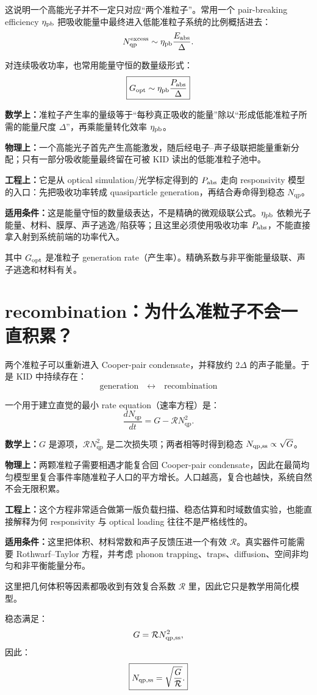 \documentclass[11pt,a4paper,openany]{ctexrep}
\newcommand{\formulaexplain}[4]{%
\begin{formulaguidebox}
\textbf{\color{KidBlue}数学上：}#1\par
\textbf{\color{KidTeal}物理上：}#2\par
\textbf{\color{KidGold!55!black}工程上：}#3\par
\textbf{\color{KidRed}适用条件：}#4
\end{formulaguidebox}%
}
\newcommand{\qp}{\mathrm{qp}}
\begin{document}
这说明一个高能光子并不一定只对应“两个准粒子”。常用一个 pair-breaking efficiency $\eta_{\rm pb}$ 把吸收能量中最终进入低能准粒子系统的比例概括进去：
\[
N_{\qp}^{\rm excess}
\sim
\eta_{\rm pb}\frac{E_{\rm abs}}{\Delta}.
\]

对连续吸收功率，也常用能量守恒的数量级形式：
\[
\boxed{
G_{\rm opt}
\sim
\eta_{\rm pb}\frac{P_{\rm abs}}{\Delta}
}
\]
\formulaexplain
{准粒子产生率的量级等于“每秒真正吸收的能量”除以“形成低能准粒子所需的能量尺度 $\Delta$”，再乘能量转化效率 $\eta_{\rm pb}$。}
{一个高能光子首先产生高能激发，随后经电子--声子级联把能量重新分配；只有一部分吸收能量最终留在可被 KID 读出的低能准粒子池中。}
{它是从 optical simulation/光学标定得到的 $P_{\rm abs}$ 走向 responsivity 模型的入口：先把吸收功率转成 quasiparticle generation，再结合寿命得到稳态 $N_{\qp}$。}
{这是能量守恒的数量级表达，不是精确的微观级联公式。$\eta_{\rm pb}$ 依赖光子能量、材料、膜厚、声子逃逸/陷获等；且这里必须使用吸收功率 $P_{\rm abs}$，不能直接拿入射到系统前端的功率代入。}

其中 $G_{\rm opt}$ 是准粒子 generation rate（产生率）。精确系数与非平衡能量级联、声子逃逸和材料有关。

\section{recombination：为什么准粒子不会一直积累？}

两个准粒子可以重新进入 Cooper-pair condensate，并释放约 $2\Delta$ 的声子能量。于是 KID 中持续存在：
\[
\boxed{\text{generation}\quad\leftrightarrow\quad\text{recombination}}
\]

一个用于建立直觉的最小 rate equation（速率方程）是：
\[
\boxed{
\frac{dN_{\qp}}{dt}
=
G-\mathcal{R}N_{\qp}^2.
}
\]
\formulaexplain
{$G$ 是源项，$\mathcal{R}N_{\qp}^2$ 是二次损失项；两者相等时得到稳态 $N_{\qp,\rm ss}\propto\sqrt{G}$。}
{两颗准粒子需要相遇才能复合回 Cooper-pair condensate，因此在最简均匀模型里复合事件率随准粒子人口的平方增长。人口越高，复合也越快，系统自然不会无限积累。}
{这个方程非常适合做第一版负载扫描、稳态估算和时域数值实验，也能直接解释为何 responsivity 与 optical loading 往往不是严格线性的。}
{这里把体积、材料常数和声子反馈压进一个有效 $\mathcal{R}$。真实器件可能需要 Rothwarf--Taylor 方程，并考虑 phonon trapping、traps、diffusion、空间非均匀和非平衡能量分布。}

这里把几何体积等因素都吸收到有效复合系数 $\mathcal{R}$ 里，因此它只是教学用简化模型。

稳态满足：
\[
G=\mathcal{R}N_{\qp,\rm ss}^2,
\]
因此：
\[
\boxed{
N_{\qp,\rm ss}
=
\sqrt{\frac{G}{\mathcal{R}}}.
}
\]
\end{document}
